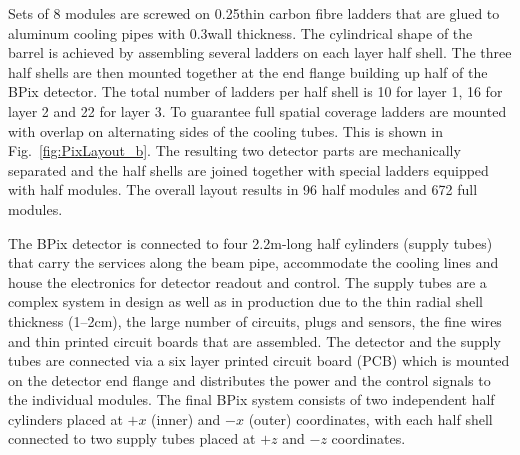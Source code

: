 Sets of 8 modules are screwed on 0.25\mm thin carbon fibre ladders that are glued to aluminum cooling pipes with 0.3\mm wall thickness.
The cylindrical shape of the barrel is achieved by assembling several ladders on each layer half shell.
The three half shells are then mounted together at the end flange building up half of the BPix detector.
The total number of ladders per half shell is 10 for layer 1, 16 for layer 2 and 22 for layer 3.
To guarantee full spatial coverage ladders are mounted with overlap on alternating sides of the cooling tubes. This is shown in Fig.~\ref{fig:PixLayout_b}.
The resulting two detector parts are mechanically separated and the half shells are joined together with special ladders equipped with half modules.
The overall layout results in 96 half modules and 672 full modules.

The BPix detector is connected to four 2.2\unit{m}-long half cylinders (supply tubes) that carry the services along the beam pipe, accommodate the cooling lines and house the electronics for detector readout and control. The supply tubes are a complex system in design as well as in production due to the thin radial shell thickness (1--2\unit{cm}), the large number of circuits, plugs and sensors, the fine wires and thin printed circuit boards that are assembled.
The detector and the supply tubes are connected via a six layer printed circuit board (PCB) which is mounted on the detector end flange and distributes the power and the control signals to the individual modules.
The final BPix system consists of two independent half cylinders placed at $+x$ (inner) and $-x$ (outer) coordinates,
with each half shell connected to two supply tubes placed at $+z$ and $-z$ coordinates.

